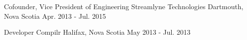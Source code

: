 \begin{cventries}
  \cventry
    {Cofounder, Vice President of Engineering} %
    {Streamlyne Technologies}  %
    {Dartmouth, Nova Scotia} %
    {Apr. 2013 - Jul. 2015} %
    {
      \begin{cvitems} %
      \end{cvitems} 
    }

  \cventry
    {Developer} %
    {Compilr} %
    {Halifax, Nova Scotia} %
    {May 2013 - Jul. 2013} %
    {
      \begin{cvitems} %
      \end{cvitems}
    }

\end{cventries}
